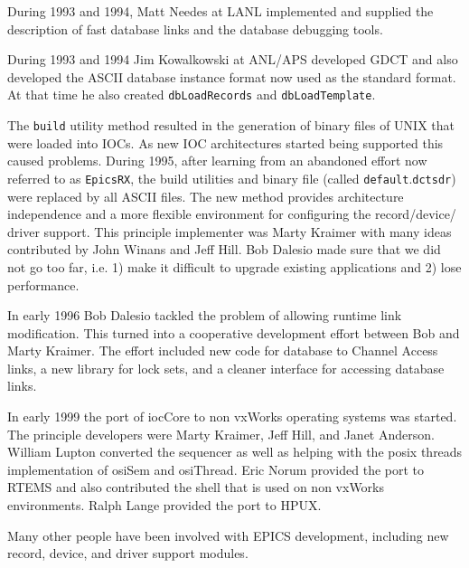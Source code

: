 During 1993 and 1994, Matt Needes at LANL implemented and supplied the description of fast database links and the 
database debugging tools.

During 1993 and 1994 Jim Kowalkowski at ANL/APS developed GDCT and also developed the ASCII database instance 
format now used as the standard format. At that time he also created \verb|dbLoadRecords| and \verb|dbLoadTemplate|.

The \verb|build| utility method resulted in the generation of binary files of UNIX that were loaded into IOCs. As new IOC 
architectures started being supported this caused problems. During 1995, after learning from an abandoned effort now 
referred to as \verb|EpicsRX|, the build utilities and binary file (called \verb|default|.\verb|dctsdr|) were replaced by all ASCII files. 
The new method provides architecture independence and a more flexible environment for configuring the record/device/
driver support. This principle implementer was Marty Kraimer with many ideas contributed by John Winans and Jeff Hill. 
Bob Dalesio made sure that we did not go too far, i.e. 1) make it difficult to upgrade existing applications and 2) lose 
performance.

In early 1996 Bob Dalesio tackled the problem of allowing runtime link modification. This turned into a cooperative 
development effort between Bob and Marty Kraimer. The effort included new code for database to Channel Access links, 
a new library for lock sets, and a cleaner interface for accessing database links.

In early 1999 the port of iocCore to non vxWorks operating systems was started. The principle developers were Marty 
Kraimer, Jeff Hill, and Janet Anderson. William Lupton converted the sequencer as well as helping with the posix threads 
implementation of osiSem and osiThread. Eric Norum provided the port to RTEMS and also contributed the shell that is 
used on non vxWorks environments. Ralph Lange provided the port to HPUX.

Many other people have been involved with EPICS development, including new record, device, and driver support 
modules.
